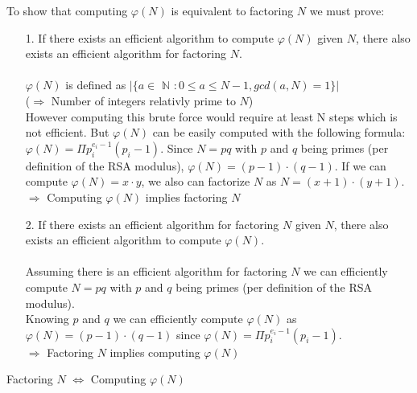 
To show that computing \(\varphi(N)\) is equivalent to factoring \(N\) we must prove:
\begin{itemize}
\item [1.]
If there exists an efficient algorithm to compute \(\varphi(N)\) given \(N\), there also exists an efficient algorithm for factoring \(N\).\\ \\
\(\varphi(N)\) is defined as \(|\{a \in\) $\mathbb{N}$ \(: 0 \leq a \leq N-1, gcd(a, N) = 1\}|\) \\
(\(\Rightarrow\) Number of integers relativly prime to \(N\))\\
However computing this brute force would require at least N steps which is not efficient. But \(\varphi(N)\) can be easily computed with the following formula: 
\(\varphi(N) = \Pi p_i^{e_i - 1}(p_i - 1)\). Since \(N = pq\) with \(p\) and \(q\) being primes (per definition of the RSA modulus), \(\varphi(N) = (p-1) \cdot (q-1)\).
If we can compute \(\varphi(N) = x \cdot y\), we also can factorize \(N\) as \(N = (x+1) \cdot (y+1)\). \\
\(\Rightarrow\) Computing \(\varphi(N)\) implies factoring \(N\) \\

\item [2.]
If there exists an efficient algorithm for factoring \(N\) given \(N\), there also exists an efficient algorithm to compute \(\varphi(N)\).\\ \\
Assuming there is an efficient algorithm for factoring \(N\) we can efficiently compute \(N = pq\) with \(p\) and \(q\) being primes (per definition of the RSA modulus).\\
Knowing \(p\) and \(q\) we can efficiently compute \(\varphi(N)\) as \(\varphi(N) = (p-1)\cdot(q-1)\) since \(\varphi(N) = \Pi p_i^{e_i - 1}(p_i - 1)\).\\
\(\Rightarrow\) Factoring \(N\) implies computing \(\varphi(N)\)\\

\end{itemize}

Factoring \(N\) \(\Leftrightarrow\) Computing \(\varphi(N)\)\\